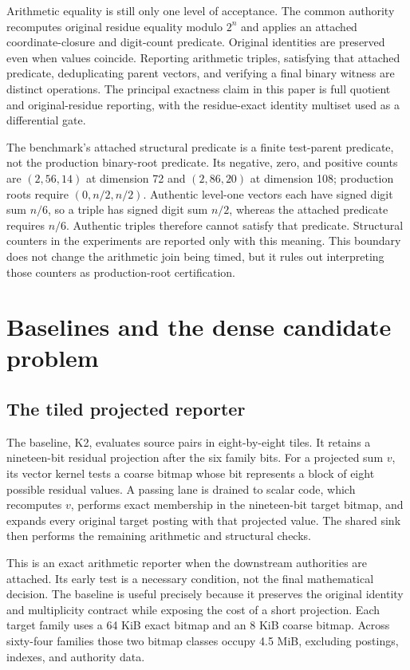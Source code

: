 \documentclass[manuscript,screen,review]{acmart}
\begin{document}
Arithmetic equality is still only one level of acceptance. The common authority recomputes original residue equality modulo $2^n$ and applies an attached coordinate-closure and digit-count predicate. Original identities are preserved even when values coincide. Reporting arithmetic triples, satisfying that attached predicate, deduplicating parent vectors, and verifying a final binary witness are distinct operations. The principal exactness claim in this paper is full quotient and original-residue reporting, with the residue-exact identity multiset used as a differential gate.

The benchmark's attached structural predicate is a finite test-parent predicate, not the production binary-root predicate. Its negative, zero, and positive counts are $(2,56,14)$ at dimension 72 and $(2,86,20)$ at dimension 108; production roots require $(0,n/2,n/2)$. Authentic level-one vectors each have signed digit sum $n/6$, so a triple has signed digit sum $n/2$, whereas the attached predicate requires $n/6$. Authentic triples therefore cannot satisfy that predicate. Structural counters in the experiments are reported only with this meaning. This boundary does not change the arithmetic join being timed, but it rules out interpreting those counters as production-root certification.

\section{Baselines and the dense candidate problem}
\subsection{The tiled projected reporter}
The baseline, K2, evaluates source pairs in eight-by-eight tiles. It retains a nineteen-bit residual projection after the six family bits. For a projected sum $v$, its vector kernel tests a coarse bitmap whose bit represents a block of eight possible residual values. A passing lane is drained to scalar code, which recomputes $v$, performs exact membership in the nineteen-bit target bitmap, and expands every original target posting with that projected value. The shared sink then performs the remaining arithmetic and structural checks.

This is an exact arithmetic reporter when the downstream authorities are attached. Its early test is a necessary condition, not the final mathematical decision. The baseline is useful precisely because it preserves the original identity and multiplicity contract while exposing the cost of a short projection. Each target family uses a 64 KiB exact bitmap and an 8 KiB coarse bitmap. Across sixty-four families those two bitmap classes occupy 4.5 MiB, excluding postings, indexes, and authority data.
\end{document}
